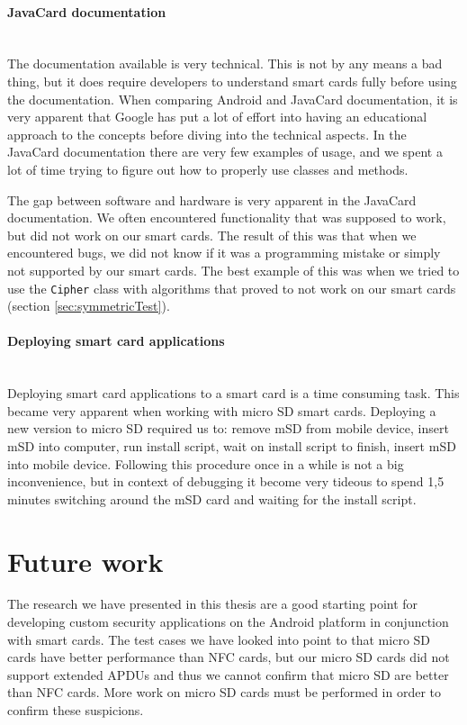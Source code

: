 \paragraph{JavaCard documentation}\mbox{}\\
The documentation available is very technical. This is not by any means a bad thing, but it does require developers to understand smart cards fully before using the documentation. When comparing Android and JavaCard documentation, it is very apparent that Google has put a lot of effort into having an educational approach to the concepts before diving into the technical aspects. In the JavaCard documentation there are very few examples of usage, and we spent a lot of time trying to figure out how to properly use classes and methods.

The gap between software and hardware is very apparent in the JavaCard documentation. We often encountered functionality that was supposed to work, but did not work on our smart cards. The result of this was that when we encountered bugs, we did not know if it was a programming mistake or simply not supported by our smart cards. The best example of this was when we tried to use the \texttt{Cipher} class with algorithms that proved to not work on our smart cards (section \ref{sec:symmetricTest}).

\paragraph{Deploying smart card applications}\mbox{}\\
Deploying smart card applications to a smart card is a time consuming task. This became very apparent when working with micro SD smart cards. Deploying a new version to micro SD required us to: remove mSD from mobile device, insert mSD into computer, run install script, wait on install script to finish, insert mSD into mobile device. Following this procedure once in a while is not a big inconvenience, but in context of debugging it become very tideous to spend 1,5 minutes switching around the mSD card and waiting for the install script.

\section{Future work}
\label{sec:future}
The research we have presented in this thesis are a good starting point for developing custom security applications on the Android platform in conjunction with smart cards. The test cases we have looked into point to that micro SD cards have better performance than NFC cards, but our micro SD cards did not support extended APDUs and thus we cannot confirm that micro SD are better than NFC cards. More work on micro SD cards must be performed in order to confirm these suspicions.

